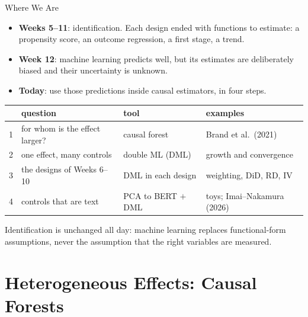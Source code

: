 \documentclass[aspectratio=169,11pt,xcolor=dvipsnames]{beamer}
\newcommand{\core}{\,\raisebox{0.6pt}{\textcolor{corestar}{$\bigstar$}}}
\begin{document}
\begin{frame}{Where We Are\core}
\begin{itemize}\itemsep4pt
  \item \textbf{Weeks 5--11}: identification. Each design ended with functions to
        estimate: a propensity score, an outcome regression, a first stage, a trend.
  \item \textbf{Week 12}: machine learning predicts well, but its estimates are
        deliberately biased and their uncertainty is unknown.
  \item \textbf{Today}: use those predictions inside causal estimators, in four steps.
\end{itemize}
\vskip4pt
\begin{center}\small
\renewcommand{\arraystretch}{1.15}
\begin{tabular}{@{}llll@{}}
\toprule
& question & tool & examples \\
\midrule
1 & for whom is the effect larger? & causal forest & Brand et al.\ (2021) \\
2 & one effect, many controls & double ML (DML) & growth and convergence \\
3 & the designs of Weeks 6--10 & DML in each design & weighting, DiD, RD, IV \\
4 & controls that are text & PCA to BERT $+$ DML & toys; Imai--Nakamura (2026) \\
\bottomrule
\end{tabular}
\end{center}
\vskip4pt
{\small Identification is unchanged all day: machine learning replaces functional-form
assumptions, never the assumption that the right variables are measured.}
\end{frame}

\section[Causal Forests]{Heterogeneous Effects: Causal Forests}
\begin{frame}\sectionpage\end{frame}
\end{document}
